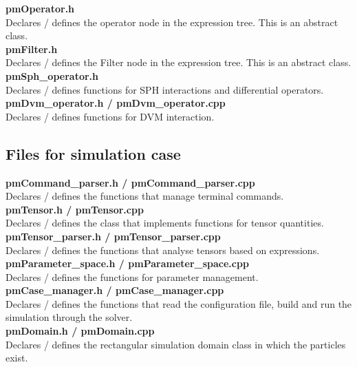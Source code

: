 \documentclass[a4paper,12pt,openany]{book}
\theoremstyle{break}
\begin{document}
\textbf{pmOperator.h} \\
Declares / defines the operator node in the expression tree. This is an abstract class. \\

\textbf{pmFilter.h} \\
Declares / defines the Filter node in the expression tree. This is an abstract class. \\

\textbf{pmSph\_operator.h} \\
Declares / defines functions for SPH interactions and differential operators. \\

\textbf{pmDvm\_operator.h / pmDvm\_operator.cpp} \\
Declares / defines functions for DVM interaction. \\

\subsection{Files for simulation case}

\textbf{pmCommand\_parser.h / pmCommand\_parser.cpp} \\
Declares / defines the functions that manage terminal commands. \\

\textbf{pmTensor.h / pmTensor.cpp} \\
Declares / defines the class that implements functions for tensor quantities. \\

\textbf{pmTensor\_parser.h / pmTensor\_parser.cpp} \\
Declares / defines the functions that analyse tensors based on expressions. \\

\textbf{pmParameter\_space.h / pmParameter\_space.cpp} \\
Declares / defines the functions for parameter management. \\

\textbf{pmCase\_manager.h / pmCase\_manager.cpp} \\
Declares / defines the functions that read the configuration file, build and run the simulation through the solver. \\

\textbf{pmDomain.h / pmDomain.cpp} \\
Declares / defines the rectangular simulation domain class in which the particles exist. \\
\end{document}
